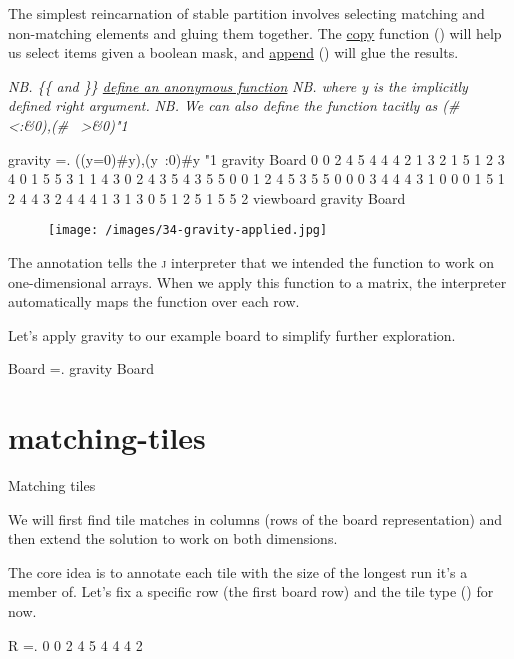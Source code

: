 \documentclass{article}
\begin{document}
The simplest reincarnation of stable partition involves selecting matching and non-matching elements and gluing them together.
The \href{https://code.jsoftware.com/wiki/Vocabulary/number#dyadic}{copy} function (\code{#}) will help us select items given a boolean mask,
and \href{https://code.jsoftware.com/wiki/Vocabulary/comma#dyadic}{append} (\code{,}) will glue the results.

\begin{code}[j]
   \emph{NB. \{\{ and \}\} \href{https://code.jsoftware.com/wiki/Vocabulary/DirectDefinition}{define an anonymous function}}
   \emph{NB. where y is the implicitly defined right argument.}
   \emph{NB. We can also define the function tacitly as (#~ <:\&0),(#~ >\&0)"1}

   gravity =. {{ ((y=0)#y),(y~:0)#y }}"1
   gravity Board
0 0 2 4 5 4 4 4 2
1 3 2 1 5 1 2 3 4
0 1 5 5 3 1 1 4 3
0 2 4 3 5 4 3 5 5
0 0 1 2 4 5 3 5 5
0 0 0 3 4 4 4 3 1
0 0 0 1 5 1 2 4 4
3 2 4 4 4 1 3 1 3
0 5 1 2 5 1 5 5 2
   viewboard gravity Board
\end{code}

\begin{figure}
\texttt{[image: /images/34-gravity-applied.jpg]}
\end{figure}

The  annotation tells the \textsc{j} interpreter that we intended the  function to work on one-dimensional arrays.
When we apply this function to a matrix, the interpreter automatically maps the function over each row.

Let's apply gravity to our example board to simplify further exploration.

\begin{code}[j]
   Board =. gravity Board
\end{code}

\section{matching-tiles}{Matching tiles}

We will first find tile matches in columns (rows of the board representation) and then extend the solution to work on both dimensions.

The core idea is to annotate each tile with the size of the longest run it's a member of.
Let's fix a specific row (the first board row) and the tile type () for now.

\begin{code}[j]
   R =. 0 0 2 4 5 4 4 4 2
\end{code}
\end{document}
